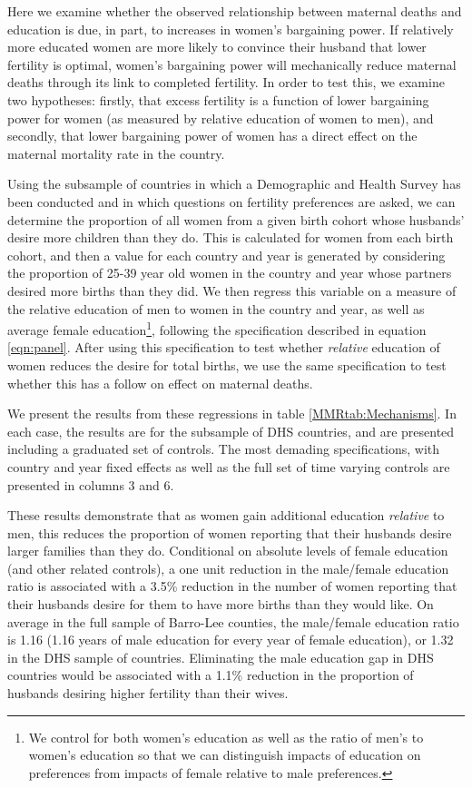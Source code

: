 \documentclass{article}[12pt,subeqn]
\begin{document}
\begin{spacing}{1.4}
Here we examine whether the observed relationship between maternal deaths
and education is due, in part, to increases in women's bargaining power.
If relatively more educated women are more likely to convince their husband
that lower fertility is optimal, women's bargaining power will mechanically
reduce maternal deaths through its link to completed fertility. In order to
test this, we examine two hypotheses: firstly, that excess fertility is a
function of lower bargaining power for women (as measured by relative education
of women to men), and secondly, that lower bargaining power of women has a
direct effect on the maternal mortality rate in the country.

Using the subsample of countries in which a Demographic and Health Survey has
been conducted and in which questions on fertility preferences are asked, we
can determine the proportion of all women from a given birth cohort whose
husbands' desire more children than they do.  This is calculated for women
from each birth cohort, and then a value for each country and year is generated
by considering the proportion of 25-39 year old women in the country and
year whose partners desired more births than they did.  We then regress this
variable on a measure of the relative education of men to women in the country
and year, as well as average female education\footnote{We control for both women's
  education as well as the ratio of men's to women's education so that we can
  distinguish impacts of education on preferences from impacts of female relative
  to male preferences.}, following the specification described in equation
\ref{eqn:panel}.  After using this specification to test whether \emph{relative}
education of women reduces the desire for total births, we use the same
specification to test whether this has a follow on effect on maternal deaths.

We present the results from these regressions in table \ref{MMRtab:Mechanisms}.
In each case, the results are for the subsample of DHS countries, and are
presented including a graduated set of controls.  The most demading specifications,
with country and year fixed effects as well as the full set of time varying
controls are presented in columns 3 and 6.

These results demonstrate that as women gain additional education \emph{relative}
to men, this reduces the proportion of women reporting that their husbands desire
larger families than they do.  Conditional on absolute levels of female education
(and other related controls), a one unit reduction in the male/female education
ratio is associated with a 3.5\% reduction in the number of women reporting that
their husbands desire for them to have more births than they would like.  On
average in the full sample of Barro-Lee counties, the male/female education ratio
is 1.16 (1.16 years of male education for every year of female education), or 1.32
in the DHS sample of countries.  Eliminating the male education gap in DHS
countries would be associated with a 1.1\% reduction in the proportion of husbands
desiring higher fertility than their wives.


\end{spacing}
\end{document}
